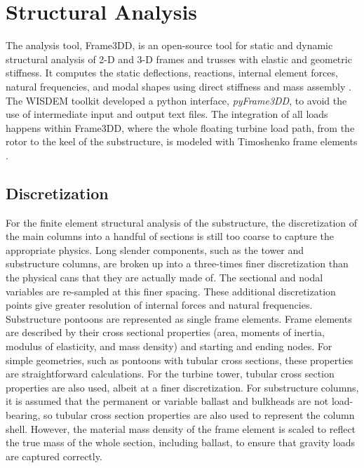 \section{Structural Analysis}
The analysis tool, Frame3DD, is an open-source tool for static and
dynamic structural analysis of 2-D and 3-D frames and trusses with
elastic and geometric stiffness. It computes the static deflections,
reactions, internal element forces, natural frequencies, and modal
shapes using direct stiffness and mass assembly \citep{frame3dd}.  The
WISDEM toolkit developed a python interface, \textit{pyFrame3DD}, to
avoid the use of intermediate input and output text files.  The
integration of all loads happens within Frame3DD, where the whole floating
turbine load path, from the rotor to the keel of the substructure, is
modeled with Timoshenko frame elements \citep{timoshenko}.

\subsection{Discretization}
For the finite element structural analysis of the substructure, the
discretization of the main columns into a handful of sections is still
too coarse to capture the appropriate physics. Long slender components,
such as the tower and substructure columns, are broken up into a
three-times finer discretization than the physical cans that they are
actually made of.  The sectional and nodal variables are re-sampled at
this finer spacing.  These additional discretization points give greater
resolution of internal forces and natural frequencies.  Substructure
pontoons are represented as single frame elements.  Frame elements are
described by their cross sectional properties (area, moments of inertia,
modulus of elasticity, and mass density) and starting and ending nodes.
For simple geometries, such as pontoons with tubular cross sections,
these properties are straightforward calculations.  For the turbine
tower, tubular cross section properties are also used, albeit at a finer
discretization.  For substructure columns, it is assumed that the
permanent or variable ballast and bulkheads are not load-bearing, so
tubular cross section properties are also used to represent the column
shell.  However, the material mass density of the frame element is
scaled to reflect the true mass of the whole section, including ballast,
to ensure that gravity loads are captured correctly.

